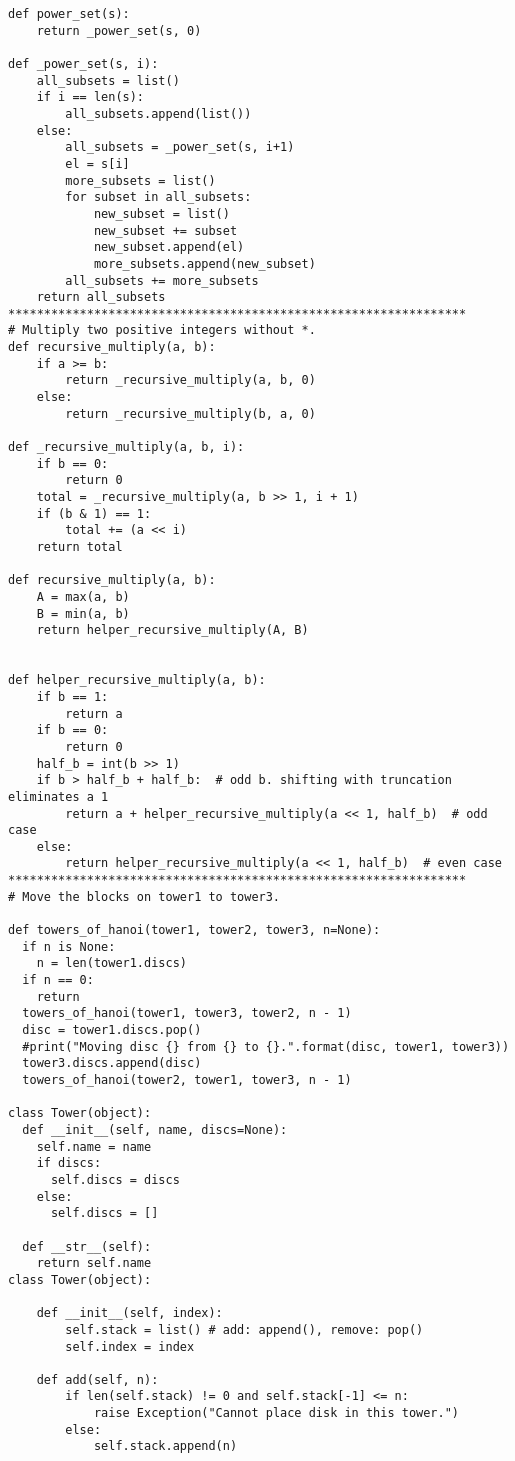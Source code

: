 \documentclass[12pt]{article}
\begin{document}
\begin{lstlisting}
def power_set(s):
    return _power_set(s, 0)

def _power_set(s, i):
    all_subsets = list()
    if i == len(s):
        all_subsets.append(list())
    else:
        all_subsets = _power_set(s, i+1)
        el = s[i]
        more_subsets = list()
        for subset in all_subsets:
            new_subset = list()
            new_subset += subset
            new_subset.append(el)
            more_subsets.append(new_subset)
        all_subsets += more_subsets
    return all_subsets
****************************************************************
# Multiply two positive integers without *.
def recursive_multiply(a, b):
    if a >= b:
        return _recursive_multiply(a, b, 0)
    else:
        return _recursive_multiply(b, a, 0)

def _recursive_multiply(a, b, i):
    if b == 0:
        return 0
    total = _recursive_multiply(a, b >> 1, i + 1)
    if (b & 1) == 1:
        total += (a << i)
    return total

def recursive_multiply(a, b):
    A = max(a, b)
    B = min(a, b)
    return helper_recursive_multiply(A, B)


def helper_recursive_multiply(a, b):
    if b == 1:
        return a
    if b == 0:
        return 0
    half_b = int(b >> 1)
    if b > half_b + half_b:  # odd b. shifting with truncation eliminates a 1
        return a + helper_recursive_multiply(a << 1, half_b)  # odd case
    else:
        return helper_recursive_multiply(a << 1, half_b)  # even case
****************************************************************
# Move the blocks on tower1 to tower3.

def towers_of_hanoi(tower1, tower2, tower3, n=None):
  if n is None:
    n = len(tower1.discs)
  if n == 0:
    return
  towers_of_hanoi(tower1, tower3, tower2, n - 1)
  disc = tower1.discs.pop()
  #print("Moving disc {} from {} to {}.".format(disc, tower1, tower3))
  tower3.discs.append(disc)
  towers_of_hanoi(tower2, tower1, tower3, n - 1)

class Tower(object):
  def __init__(self, name, discs=None):
    self.name = name
    if discs:
      self.discs = discs
    else:
      self.discs = []
  
  def __str__(self):
    return self.name
class Tower(object):

    def __init__(self, index):
        self.stack = list() # add: append(), remove: pop()
        self.index = index

    def add(self, n):
        if len(self.stack) != 0 and self.stack[-1] <= n:
            raise Exception("Cannot place disk in this tower.")
        else:
            self.stack.append(n)


\end{lstlisting}
\end{document}
